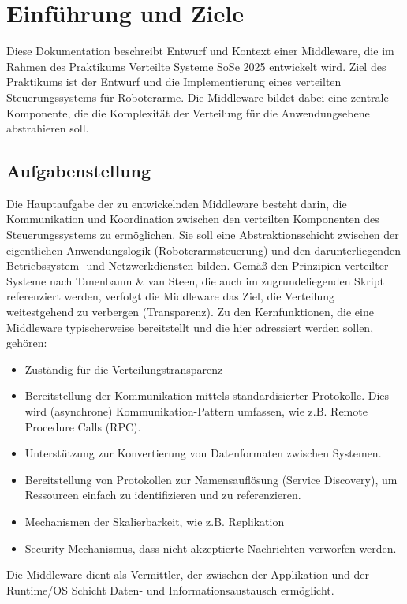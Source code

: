 \chapter{Einführung und Ziele}

Diese Dokumentation beschreibt Entwurf und Kontext einer Middleware, die im Rahmen des Praktikums \glqq Verteilte Systeme SoSe 2025\grqq{} entwickelt wird. Ziel des Praktikums ist der Entwurf und die Implementierung eines verteilten Steuerungssystems für Roboterarme. Die Middleware bildet dabei eine zentrale Komponente, die die Komplexität der Verteilung für die Anwendungsebene abstrahieren soll.


\section{Aufgabenstellung}
Die Hauptaufgabe der zu entwickelnden Middleware besteht darin, die Kommunikation und Koordination zwischen den verteilten Komponenten des Steuerungssystems zu ermöglichen. Sie soll eine Abstraktionsschicht zwischen der eigentlichen Anwendungslogik (Roboterarmsteuerung) und den darunterliegenden Betriebssystem- und Netzwerkdiensten bilden. Gemäß den Prinzipien verteilter Systeme nach Tanenbaum \& van Steen, die auch im zugrundeliegenden Skript referenziert werden, verfolgt die Middleware das Ziel, die Verteilung weitestgehend zu verbergen (Transparenz).
Zu den Kernfunktionen, die eine Middleware typischerweise bereitstellt und die hier adressiert werden sollen, gehören:

\begin{itemize}
	\item Zuständig für die Verteilungstransparenz	
	\item Bereitstellung der Kommunikation mittels standardisierter Protokolle. Dies wird (asynchrone) Kommunikation-Pattern umfassen, wie z.B. Remote Procedure Calls (RPC).
	\item Unterstützung zur Konvertierung von Datenformaten zwischen Systemen.
	\item Bereitstellung von Protokollen zur Namensauflösung (Service Discovery), um Ressourcen einfach zu identifizieren und zu referenzieren.
	\item Mechanismen der Skalierbarkeit, wie z.B. Replikation
	\item Security Mechanismus, dass nicht akzeptierte Nachrichten verworfen werden. 
\end{itemize}

Die Middleware dient als Vermittler, der zwischen der Applikation und der Runtime/OS Schicht Daten- und Informationsaustausch ermöglicht.


